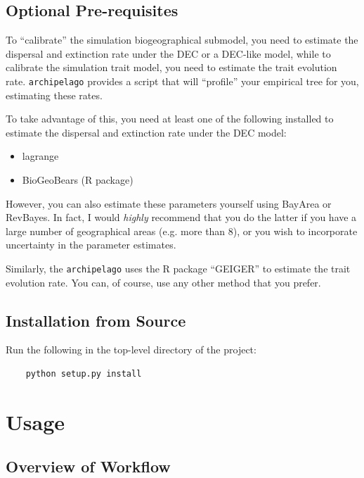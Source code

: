 \documentclass[11pt,openany]{memoir} %
\newcommand{\archipelagoPackage}{\texttt{archipelago}\xspace}
\begin{document}
\section{Optional Pre-requisites}
To ``calibrate'' the simulation biogeographical submodel, you need to estimate the dispersal and extinction rate under the DEC or a DEC-like model, while to calibrate the simulation trait model, you need to estimate the trait evolution rate.
\archipelagoPackage provides a script that will ``profile'' your empirical tree for you, estimating these rates.

To take advantage of this, you need at least one of the following installed to estimate the dispersal and extinction rate under the DEC model:
    \begin{itemize}
        \item lagrange
        \item BioGeoBears (R package)
    \end{itemize}
However, you can also estimate these parameters yourself using BayArea or RevBayes.
In fact, I would \textit{highly} recommend that you do the latter if you have a large number of geographical areas (e.g. more than 8), or you wish to incorporate uncertainty in the parameter estimates.

Similarly, the \archipelagoPackage uses the R package ``GEIGER'' to estimate the trait evolution rate.
You can, of course, use any other method that you prefer.

\section{Installation from Source}

Run the following in the top-level directory of the project:

\begin{lstlisting}
    python setup.py install
\end{lstlisting}


\chapter{Usage}

\section{Overview of Workflow}
\end{document}
